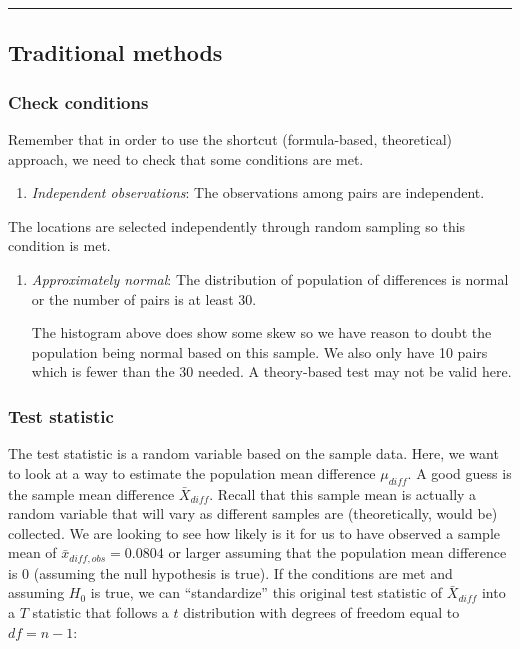 \documentclass[]{tufte-book}
\let\oldrule=\rule
\renewcommand{\rule}[1]{\oldrule{\linewidth}}
\providecommand{\tightlist}{%
  \setlength{\itemsep}{0pt}\setlength{\parskip}{0pt}}
\begin{document}
\begin{center}\rule{0.5\linewidth}{\linethickness}\end{center}

\subsection{Traditional methods}\label{traditional-methods-4}

\subsubsection{Check conditions}\label{check-conditions-4}

Remember that in order to use the shortcut (formula-based, theoretical)
approach, we need to check that some conditions are met.

\begin{enumerate}
\def\labelenumi{\arabic{enumi}.}
\tightlist
\item
  \emph{Independent observations}: The observations among pairs are
  independent.
\end{enumerate}

The locations are selected independently through random sampling so this
condition is met.

\begin{enumerate}
\def\labelenumi{\arabic{enumi}.}
\setcounter{enumi}{1}
\item
  \emph{Approximately normal}: The distribution of population of
  differences is normal or the number of pairs is at least 30.

  The histogram above does show some skew so we have reason to doubt the
  population being normal based on this sample. We also only have 10
  pairs which is fewer than the 30 needed. A theory-based test may not
  be valid here.
\end{enumerate}

\subsubsection{Test statistic}\label{test-statistic-4}

The test statistic is a random variable based on the sample data. Here,
we want to look at a way to estimate the population mean difference
\(\mu_{diff}\). A good guess is the sample mean difference
\(\bar{X}_{diff}\). Recall that this sample mean is actually a random
variable that will vary as different samples are (theoretically, would
be) collected. We are looking to see how likely is it for us to have
observed a sample mean of \(\bar{x}_{diff, obs} = 0.0804\) or larger
assuming that the population mean difference is 0 (assuming the null
hypothesis is true). If the conditions are met and assuming \(H_0\) is
true, we can ``standardize'' this original test statistic of
\(\bar{X}_{diff}\) into a \(T\) statistic that follows a \(t\)
distribution with degrees of freedom equal to \(df = n - 1\):
\end{document}
